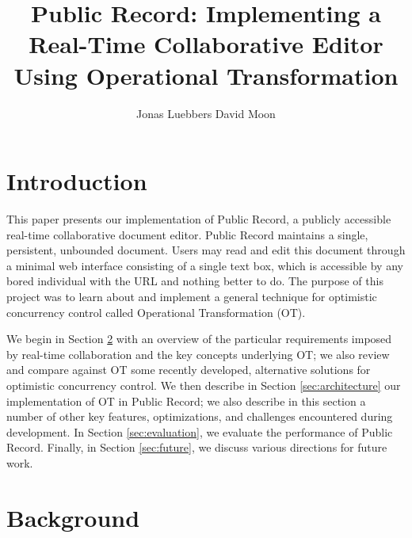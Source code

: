 \documentclass[letterpaper,11pt,twocolumn]{article}
\begin{document}
\title{Public Record: Implementing a Real-Time Collaborative Editor 
Using Operational Transformation}
\date{}

\author{
  {\rm Jonas Luebbers}\hspace{1cm}
  {\rm David Moon}
}

\maketitle

\thispagestyle{empty}
                                   
\section{Introduction}

This paper presents our implementation of Public Record, a publicly accessible real-time collaborative document editor.  Public Record maintains a single, persistent, unbounded document.  Users may read and edit this document through a minimal web interface consisting of a single text box, which is accessible by any bored individual with the URL and nothing better to do.  The purpose of this project was to learn about and implement a general technique for optimistic concurrency control called Operational Transformation (OT).

We begin in Section \ref{sec:background} with an overview of the particular requirements imposed by real-time collaboration and the key concepts underlying OT; we also review and compare against OT some recently developed, alternative solutions for  optimistic concurrency control.  We then describe in Section \ref{sec:architecture} our implementation of OT in Public Record; we also describe in this section a number of other key features, optimizations, and challenges encountered during development.  In Section \ref{sec:evaluation}, we evaluate the performance of Public Record.  Finally, in Section \ref{sec:future}, we discuss various directions for future work.




\section{Background} \label{sec:background}
\end{document}
